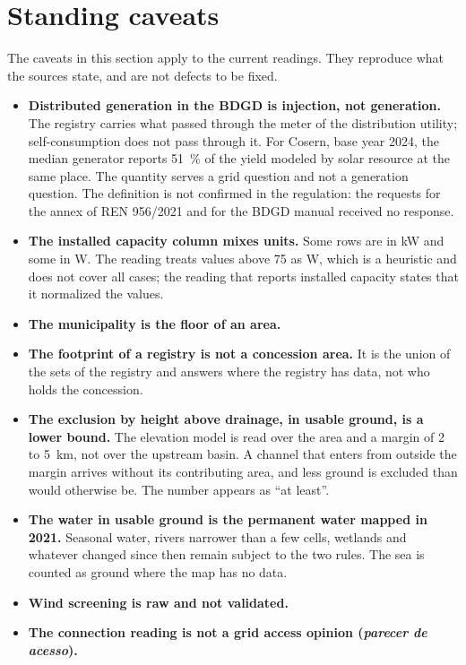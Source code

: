 \documentclass[10pt,a4paper,oneside]{article}
\begin{document}
\section{Standing caveats}
\label{sec:ressalvas}

The caveats in this section apply to the current readings. They reproduce
what the sources state, and are not defects to be fixed.

\begin{itemize}
  \item \textbf{Distributed generation in the BDGD is injection, not
    generation.} The registry carries what passed through the meter of the
    distribution utility; self-consumption does not pass through it. For
    Cosern, base year 2024, the median generator reports \qty{51}{\percent}
    of the yield modeled by solar resource at the same place. The quantity
    serves a grid question and not a generation question. The definition is
    not confirmed in the regulation: the requests for the annex of REN
    956/2021 and for the BDGD manual received no response.
  \item \textbf{The installed capacity column mixes units.} Some rows are in
    kW and some in W. The reading treats values above 75 as W, which is a
    heuristic and does not cover all cases; the reading that reports
    installed capacity states that it normalized the values.
  \item \textbf{The municipality is the floor of an area.}
  \item \textbf{The footprint of a registry is not a concession area.} It is
    the union of the sets of the registry and answers where the registry has
    data, not who holds the concession.
  \item \textbf{The exclusion by height above drainage, in usable ground, is
    a lower bound.} The elevation model is read over the area and a margin
    of 2 to \qty{5}{\kilo\metre}, not over the upstream basin. A channel that
    enters from outside the margin arrives without its contributing area,
    and less ground is excluded than would otherwise be. The number appears
    as \enquote{at least}.
  \item \textbf{The water in usable ground is the permanent water mapped in
    2021.} Seasonal water, rivers narrower than a few cells, wetlands and
    whatever changed since then remain subject to the two rules. The sea is
    counted as ground where the map has no data.
  \item \textbf{Wind screening is raw and not validated.}
  \item \textbf{The connection reading is not a grid access opinion
    (\emph{parecer de acesso}).}
\end{itemize}
\end{document}
